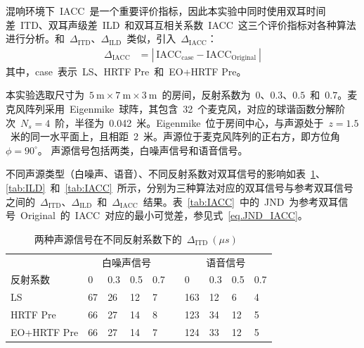 混响环境下~IACC~是一个重要评价指标，因此本实验中同时使用双耳时间差~ITD、双耳声级差~ILD~和双耳互相关系数~IACC~这三个评价指标对各种算法进行分析。和~$\Delta_{\text{ITD}}$、$\Delta_{\text{ILD}}$~类似，引入~$\Delta_{\text{IACC}}$：
\begin{align}\label{eq.delta_IACC}
\Delta_{\text{IACC}} &= \left|~\text{IACC}_{\text{case}} - \text{IACC}_{\text{Original}} ~\right|
\end{align}
其中，case~表示~LS、HRTF Pre~和~EO+HRTF Pre。

本实验选取尺寸为~$5~\mathrm m\times7~\mathrm m\times3~\mathrm m$~的房间，反射系数为~$0$、$0.3$、$0.5$~和~$0.7$。麦克风阵列采用~Eigenmike~球阵，其包含~32~个麦克风，对应的球谐函数分解阶次~$N_{s}=4$~阶，半径为~0.042~米。Eigenmike~位于房间中心，与声源处于~$z=1.5$~米的同一水平面上，且相距~2~米。声源位于麦克风阵列的正右方，即方位角~$\phi=90^{\circ}$。
声源信号包括两类，白噪声信号和语音信号。

不同声源类型（白噪声、语音）、不同反射系数对双耳信号的影响如表~\ref{tab:ITD}、\ref{tab:ILD}~和~\ref{tab:IACC}~所示，分别为三种算法对应的双耳信号与参考双耳信号之间的~$\Delta_{\text{ITD}}$、$\Delta_{\text{ILD}}$~和~$\Delta_{\text{IACC}}$~结果。表~\ref{tab:IACC}~中的~JND~为参考双耳信号~Original~的~IACC~对应的最小可觉差，参见式~\eqref{eq.JND_IACC}。

\begin{table}[H]
  \centering
  \caption{两种声源信号在不同反射系数下的~$\Delta_{\text{ITD}}~(\mu s)$~}
  {
    \begin{tabular}{m{3cm}<{\centering}m{1cm}<{\centering}m{1cm}<{\centering}m{1cm}<{\centering}m{1cm}<{\centering}m{0.2cm}<{\centering}m{1cm}<{\centering}m{1cm}<{\centering}m{1cm}<{\centering}m{1cm}<{\centering}}
    \toprule[1.5pt]
     & \multicolumn{4}{c}{白噪声信号}~ & & \multicolumn{4}{c}{语音信号} \\
    \cmidrule{2-5}  \cmidrule{7-10}
    反射系数                    & 0 & 0.3  & 0.5 & 0.7 & & 0   & 0.3  & 0.5 & 0.7 \\ \hline
    LS            & 67 & 26  & 12  & 7   & & 163 & 12   & 6   & 4 \\ \hline
    HRTF Pre      & 66 & 27  & 14  & 8   & & 123 & 34   & 12  & 5 \\ \hline
    EO+HRTF Pre   & 66 & 27  & 14  & 7   & & 124 & 33   & 12  & 5 \\
    \toprule[1.5pt]
    \end{tabular}%
  }
  \label{tab:ITD}%
\end{table}%

